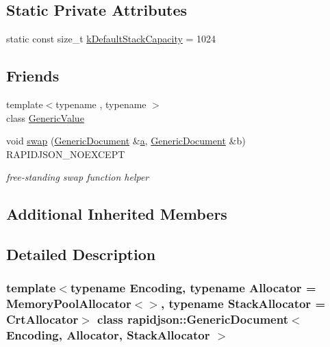 \subsection*{Static Private Attributes}
\begin{DoxyCompactItemize}
\item 
static const size\+\_\+t \mbox{\hyperlink{classrapidjson_1_1_generic_document_a557c989fcf60e58100c189555c47aa5a}{k\+Default\+Stack\+Capacity}} = 1024
\end{DoxyCompactItemize}
\subsection*{Friends}
\begin{DoxyCompactItemize}
\item 
{\footnotesize template$<$typename , typename $>$ }\\class \mbox{\hyperlink{classrapidjson_1_1_generic_document_a899449e1a645b5e377af059fb61113d8}{Generic\+Value}}
\item 
void \mbox{\hyperlink{classrapidjson_1_1_generic_document_a0d63efcc43758ac3aed77e868233369d}{swap}} (\mbox{\hyperlink{classrapidjson_1_1_generic_document}{Generic\+Document}} \&\mbox{\hyperlink{namespacerapidjson_a11fce64e721729aaf6be4a485c78f231}{a}}, \mbox{\hyperlink{classrapidjson_1_1_generic_document}{Generic\+Document}} \&b) R\+A\+P\+I\+D\+J\+S\+O\+N\+\_\+\+N\+O\+E\+X\+C\+E\+PT
\begin{DoxyCompactList}\small\item\em free-\/standing swap function helper \end{DoxyCompactList}\end{DoxyCompactItemize}
\subsection*{Additional Inherited Members}


\subsection{Detailed Description}
\subsubsection*{template$<$typename Encoding, typename Allocator = Memory\+Pool\+Allocator$<$$>$, typename Stack\+Allocator = Crt\+Allocator$>$\newline
class rapidjson\+::\+Generic\+Document$<$ Encoding, Allocator, Stack\+Allocator $>$}

